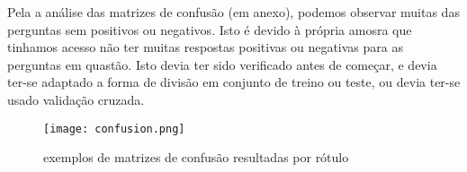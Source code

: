 \documentclass[justified, 11pt]{scrartcl}
\begin{document}
  Pela a análise das matrizes de confusão (em anexo), podemos observar muitas das perguntas sem positivos ou negativos. Isto é devido à própria amosra que tinhamos acesso não ter muitas respostas positivas ou negativas para as perguntas em quastão. Isto devia ter sido verificado antes de começar, e devia ter-se adaptado a forma de divisão em conjunto de treino ou teste, ou devia ter-se usado validação cruzada.

  \begin{figure}[H]
    \centering
    \texttt{[image: confusion.png]}
    \caption{exemplos de matrizes de confusão resultadas por rótulo}
    \label{fig:confusion_matrix}
  \end{figure}
\end{document}

